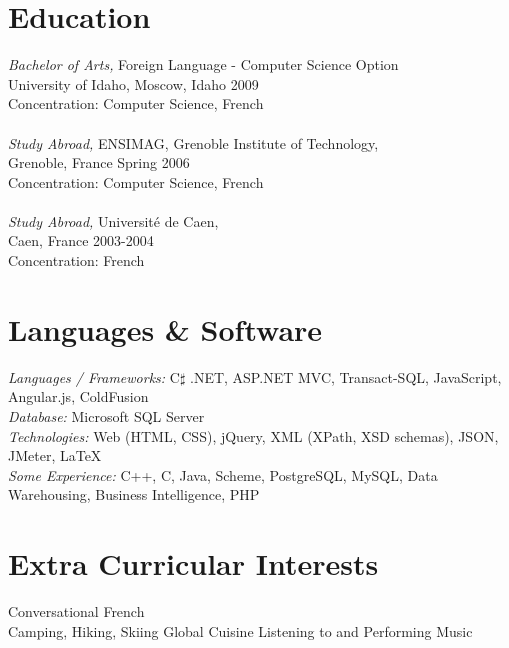 \documentclass[line,margin]{res}
\begin{document}
\begin{resume}
 
\section{Education} {\sl Bachelor of Arts,} Foreign Language - Computer Science Option\\
                University of Idaho, Moscow, Idaho
                2009 \\
                Concentration: Computer Science, French\\
		\\
		{\sl Study Abroad,} 
		ENSIMAG, Grenoble Institute of Technology, \\ Grenoble, France 
		Spring 2006 \\
		Concentration: Computer Science, French \\
		\\
		{\sl Study Abroad,} 
		Universit\'{e} de Caen, \\ Caen, France 
		2003-2004 \\
		Concentration: French
		
 
 
\section{Languages \& Software} {\sl Languages / Frameworks:} C\ensuremath{\sharp}  .NET, ASP.NET MVC, Transact-SQL, JavaScript, Angular.js, ColdFusion \\
				{\sl Database:} Microsoft SQL Server \\
				{\sl Technologies:} Web (HTML, CSS), jQuery, XML (XPath, XSD schemas), JSON, JMeter, \LaTeX \\
				{\sl Some Experience:} C++, C, Java, Scheme, PostgreSQL, MySQL, Data Warehousing, Business Intelligence, PHP \\ 

\section{Extra Curricular Interests}             
	    Conversational French \\
        Camping, Hiking, Skiing
        Global Cuisine
        Listening to and Performing Music

\end{resume}
\end{document}
